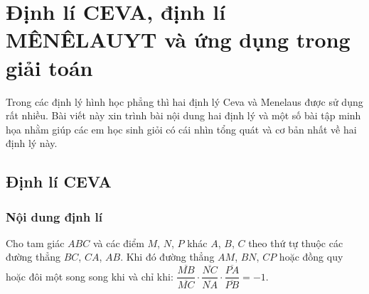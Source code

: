 \section{Định lí CEVA, định lí MÊNÊLAUYT và ứng dụng trong giải toán}
\begin{center}
	\textbf{\color{violet}{Phạm Hải Dương - THPT Chuyên Thoại Ngọc Hầu}}
\end{center}
\noindent Trong các định lý hình học phẳng thì hai định lý Ceva và Menelaus  được sử dụng rất nhiều. Bài viết này  xin trình bài nội dung hai định lý và một số bài tập minh họa nhằm giúp các em học sinh giỏi có cái nhìn tổng quát và cơ bản nhất về hai định lý này.   

\subsection{Định lí CEVA}	
\subsubsection{Nội dung định lí}
\begin{dl}
	Cho tam giác $ABC$ và các điểm $M$, $N$, $P$ khác $A$, $B$, $C$ theo thứ tự thuộc các đường thẳng $BC$, $CA$, $AB$. Khi đó đường thẳng $AM$, $BN$, $CP$ hoặc đồng quy hoặc đôi một song song khi và chỉ khi:
	$\dfrac{\overline{MB}}{\overline{MC}}\cdot\dfrac{\overline{NC}}{\overline{NA}}\cdot\dfrac{\overline{PA}}{\overline{PB}}=-1$.
\end{dl}

\begin{center}
\end{center}


